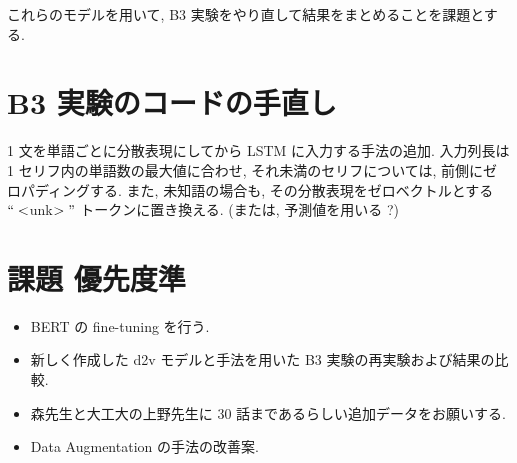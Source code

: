 \documentclass[twocolumn]{jarticle}     %
\begin{document}
これらのモデルを用いて, B3 実験をやり直して結果をまとめることを課題とする.

\section{B3 実験のコードの手直し}
1 文を単語ごとに分散表現にしてから LSTM に入力する手法の追加. 入力列長は 1 セリフ内の単語数の最大値に合わせ,
それ未満のセリフについては, 前側にゼロパディングする. また, 未知語の場合も, その分散表現をゼロベクトルとする $``<$unk$>"$ トークンに置き換える. (または, 予測値を用いる ?)

\section{課題 優先度準}
\begin{itemize}
  \item BERT の fine-tuning を行う.
  \item 新しく作成した d2v モデルと手法を用いた B3 実験の再実験および結果の比較.
  \item 森先生と大工大の上野先生に 30 話まであるらしい追加データをお願いする.
  \item Data Augmentation の手法の改善案.
\end{itemize}






\end{document}
